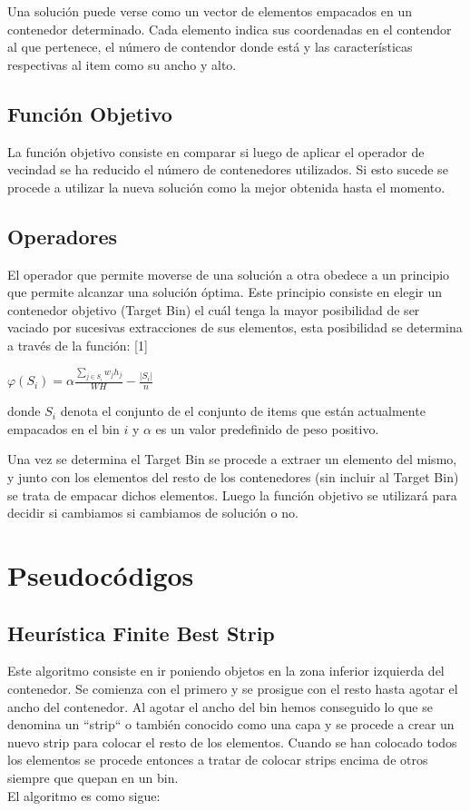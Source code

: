 \documentclass[a4paper,10pt]{article}
\begin{document}
Una solución puede verse como un vector de elementos empacados en un contenedor determinado. Cada elemento indica
sus coordenadas en el contendor al que pertenece, el número de contendor donde está y las características respectivas al
item como su ancho y alto.

\subsection{Función Objetivo}
La función objetivo consiste en comparar si luego de aplicar el operador de vecindad se ha reducido el número de contenedores
utilizados. Si esto sucede se procede a utilizar la nueva solución como la mejor obtenida hasta el momento.

\subsection{Operadores}
El operador que permite moverse de una solución a otra obedece a un principio que permite alcanzar una solución óptima. Este principio
consiste en elegir un contenedor objetivo (Target Bin) el cuál tenga la mayor posibilidad de ser vaciado por sucesivas extracciones de
sus elementos, esta posibilidad se determina a través de la función: [1]

\begin{center}
$\varphi(S_i) = \alpha \frac{\sum_{j \in S_i} {w_j h_j}}{W H} - \frac{|S_i|}{n}$
\end{center}

donde $S_i$ denota el conjunto de el conjunto de items que están actualmente empacados en el bin $i$ y $\alpha$ es un valor
predefinido de peso positivo.

Una vez se determina el Target Bin se procede a extraer un elemento del mismo, y junto con los elementos del resto de los contenedores
(sin incluir al Target Bin) se trata de empacar dichos elementos. Luego la función objetivo se utilizará para decidir si cambiamos
si cambiamos de solución o no.

\section{Pseudocódigos}

\subsection{Heurística Finite Best Strip}
Este algoritmo consiste en ir poniendo objetos en la zona inferior izquierda del contenedor. Se comienza con el primero y se prosigue con
el resto hasta agotar el ancho del contenedor. Al agotar el ancho del bin hemos conseguido lo que se denomina un ``strip`` o también conocido
como una capa y se procede a crear un nuevo strip para colocar el resto de los elementos. Cuando se han colocado todos los elementos
se procede entonces a tratar de colocar strips encima de otros siempre
que quepan en un bin.\\
\indent El algoritmo es como sigue:
\end{document}

